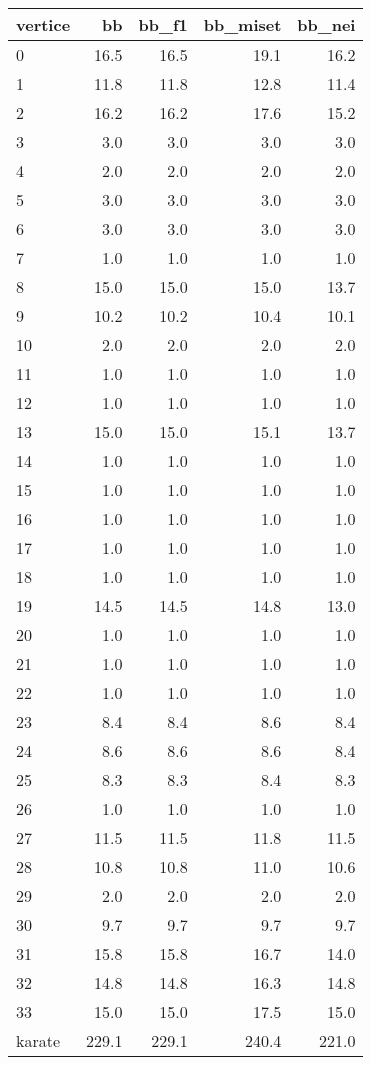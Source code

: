 \begin{tabular}{lrrrr}
\toprule
vertice & bb & bb_f1 & bb_miset & bb_nei \\
\midrule
0 & 16.5 & 16.5 & 19.1 & 16.2 \\
1 & 11.8 & 11.8 & 12.8 & 11.4 \\
2 & 16.2 & 16.2 & 17.6 & 15.2 \\
3 & 3.0 & 3.0 & 3.0 & 3.0 \\
4 & 2.0 & 2.0 & 2.0 & 2.0 \\
5 & 3.0 & 3.0 & 3.0 & 3.0 \\
6 & 3.0 & 3.0 & 3.0 & 3.0 \\
7 & 1.0 & 1.0 & 1.0 & 1.0 \\
8 & 15.0 & 15.0 & 15.0 & 13.7 \\
9 & 10.2 & 10.2 & 10.4 & 10.1 \\
10 & 2.0 & 2.0 & 2.0 & 2.0 \\
11 & 1.0 & 1.0 & 1.0 & 1.0 \\
12 & 1.0 & 1.0 & 1.0 & 1.0 \\
13 & 15.0 & 15.0 & 15.1 & 13.7 \\
14 & 1.0 & 1.0 & 1.0 & 1.0 \\
15 & 1.0 & 1.0 & 1.0 & 1.0 \\
16 & 1.0 & 1.0 & 1.0 & 1.0 \\
17 & 1.0 & 1.0 & 1.0 & 1.0 \\
18 & 1.0 & 1.0 & 1.0 & 1.0 \\
19 & 14.5 & 14.5 & 14.8 & 13.0 \\
20 & 1.0 & 1.0 & 1.0 & 1.0 \\
21 & 1.0 & 1.0 & 1.0 & 1.0 \\
22 & 1.0 & 1.0 & 1.0 & 1.0 \\
23 & 8.4 & 8.4 & 8.6 & 8.4 \\
24 & 8.6 & 8.6 & 8.6 & 8.4 \\
25 & 8.3 & 8.3 & 8.4 & 8.3 \\
26 & 1.0 & 1.0 & 1.0 & 1.0 \\
27 & 11.5 & 11.5 & 11.8 & 11.5 \\
28 & 10.8 & 10.8 & 11.0 & 10.6 \\
29 & 2.0 & 2.0 & 2.0 & 2.0 \\
30 & 9.7 & 9.7 & 9.7 & 9.7 \\
31 & 15.8 & 15.8 & 16.7 & 14.0 \\
32 & 14.8 & 14.8 & 16.3 & 14.8 \\
33 & 15.0 & 15.0 & 17.5 & 15.0 \\
karate & 229.1 & 229.1 & 240.4 & 221.0 \\
\bottomrule
\end{tabular}
